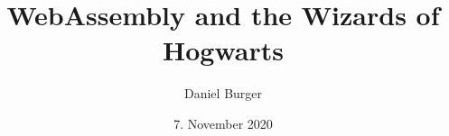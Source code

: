 \documentclass[11pt]{article}
\title{WebAssembly and the Wizards of Hogwarts}
\author{Daniel Burger}
\date{7. November 2020}
\begin{document}
\maketitle
\pagebreak

\tableofcontents
\pagebreak



\end{document}
